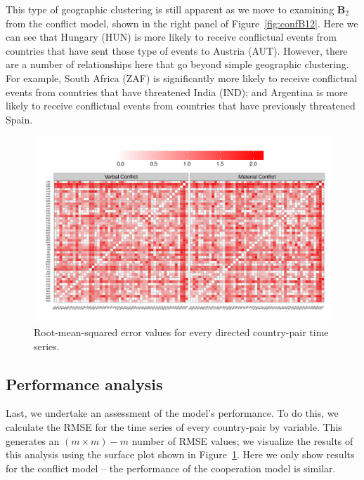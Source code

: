 \documentclass[3p,times,twocolumn,authoryear,12pt]{elsarticle}
\newcommand{\bl}[1]{{\mathbf #1}}
\begin{document}
This type of geographic clustering is still apparent as we move to examining $\bl B_2$ from the  conflict model, shown in the right panel of Figure~\ref{fig:confB12}. Here we can see that Hungary (HUN) is more likely to receive conflictual events from countries that have sent those type of events to Austria (AUT). However, there are a number of relationships here that go beyond simple geographic clustering. For example, South Africa (ZAF) is significantly more likely to receive conflictual events from countries that have threatened India (IND); and Argentina is more likely to receive conflictual events from countries that have previously threatened Spain. 

\begin{figure}[!ht]
	\centering
			\includegraphics[width=.8\textwidth]{Conf_iperf}
	\caption{Root-mean-squared error values for every directed country-pair time series.}
	\label{fig:perf}
\end{figure}

\subsection{Performance analysis}

Last, we undertake an assessment of the model's performance. To do this, we calculate the RMSE for the time series of every country-pair by variable. This generates an $(m \times m) - m$ number of RMSE values; we visualize the results of this analysis using the surface plot shown in Figure~\ref{fig:perf}. Here we only show results for the conflict model -- the performance of the cooperation model is similar. 
\end{document}
